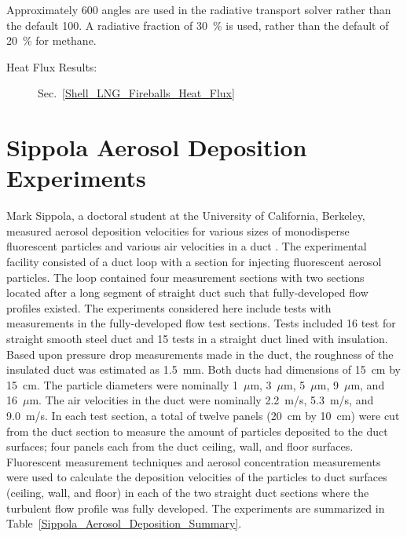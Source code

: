 Approximately 600 angles are used in the radiative transport solver rather than the default 100. A radiative fraction of 30~\% is used, rather than the default of 20~\% for methane.

\begin{description}
\item[Heat Flux Results:] Sec.~\ref{Shell_LNG_Fireballs_Heat_Flux} 
\end{description}

\FloatBarrier



\section{Sippola Aerosol Deposition Experiments}
\label{Sippola_Aerosol_Deposition_Description}

Mark Sippola, a doctoral student at the University of California, Berkeley, measured aerosol deposition velocities for various sizes of monodisperse fluorescent particles and various air velocities in a duct \cite{Sippola:2002,Sippola:2010}. The experimental facility consisted of a duct loop with a section for injecting fluorescent aerosol particles. The loop contained four measurement sections with two sections located after a long segment of straight duct such that fully-developed flow profiles existed. The experiments considered here include tests with measurements in the fully-developed flow test sections. Tests included 16 test for straight smooth steel duct and 15 tests in a straight duct lined with insulation. Based upon pressure drop measurements made in the duct, the roughness of the insulated duct was estimated as 1.5~mm. Both ducts had dimensions of 15~cm by 15~cm. The particle diameters were nominally 1~$\mu$m, 3~$\mu$m, 5~$\mu$m, 9~$\mu$m, and 16~$\mu$m. The air velocities in the duct were nominally 2.2~m/s, 5.3~m/s, and 9.0~m/s. In each test section, a total of twelve panels (20~cm by 10~cm) were cut from the duct section to measure the amount of particles deposited to the duct surfaces; four panels each from the duct ceiling, wall, and floor surfaces. Fluorescent measurement techniques and aerosol concentration measurements were used to calculate the deposition velocities of the particles to duct surfaces (ceiling, wall, and floor) in each of the two straight duct sections where the turbulent flow profile was fully developed. The experiments are summarized in Table~\ref{Sippola_Aerosol_Deposition_Summary}.

